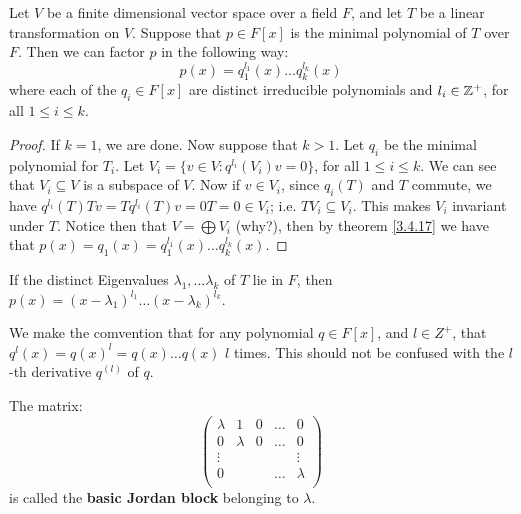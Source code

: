 \begin{theorem}\label{3.4.18}
    Let $V$ be a finite dimensional vector space over a field  $F$, and let
    $T$ be a linear transformation on  $V$. Suppose that  $p \in F[x]$ is the
    minimal polynomial of $T$ over $F$. Then we can factor $p$ in the following
    way:
    \begin{equation}
        p(x)=q_1^{l_1}(x) \dots q_k^{l_k}(x)
    \end{equation}
    where each of the $q_i \in F[x]$ are distinct irreducible polynomials and
    $l_i \in \mathbb{Z}^+$, for all  $1 \leq i \leq k$.
\end{theorem}
\begin{proof}
    If  $k=1$, we are done. Now suppose that $k>1$. Let $q_i$ be the minimal polynomial
    for  $T_i$. Let $V_i=\{v \in V: q^{l_i}(V_i)v=0\}$, for all $1 \leq i \leq k$. We can
    see that $V_i \subseteq V$ is a subspace of $V$. Now if  $v \in V_i$, since $q_i(T)$
    and  $T$ commute, we have $q^{l_i}(T)Tv=Tq^{l_i}(T)v=0T=0 \in V_i$; i.e. $TV_i
    \subseteq V_i$. This makes  $V_i$ invariant under $T$. Notice then that
    $V=\bigoplus{V_i}$ (why?), then by theorem \ref{3.4.17} we have that
    $p(x)=q_1(x)=q_1^{l_1}(x) \dots q_k^{l_k}(x)$.
\end{proof}
\begin{corollary}
    If the distinct Eigenvalues $\lambda_1, \dots \lambda_k$ of $T$ lie in  $F$,
    then $p(x)=(x-\lambda_1)^{l_1} \dots (x-\lambda_k)^{l_k}$.
\end{corollary}
\begin{remark}
    We make the comvention that for any polynomial $q \in F[x]$, and $l \in
    Z^+$, that $q^l(x)=q(x)^l=q(x) \dots q(x)$ $l$ times. This should not be
    confused with the $l$-th derivative $q^{(l)}$ of $q$.
\end{remark}

\begin{definition}
    The matrix:
        \begin{equation}
            \begin{pmatrix}
                \lambda &   1   &   0   &   \dots   &   0   \\
                0   &   \lambda &   0   &   \dots   &   0   \\
                \vdots  &   &   &           &   \vdots  \\
                0  &    &   &   \dots   &   \lambda \\
            \end{pmatrix}
        \end{equation}
    is called the \textbf{basic Jordan block} belonging to $\lambda$.
\end{definition}

